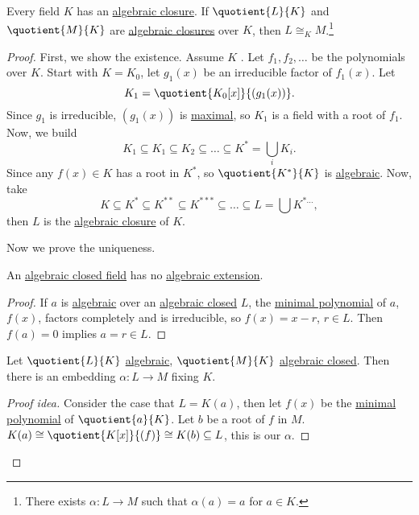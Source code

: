 \begin{theorem}
	Every field \(K\) has an \hyperref[def:algebraically-closed]{algebraic closure}. If \(\quotient{L}{K} \) and \(\quotient{M}{K} \) are \hyperref[def:algebraically-closed]{algebraic closures} over \(K\), then \(L \cong _{K} M\).\footnote{There exists \(\alpha \colon L \to M\) such that \(\alpha (a) = a\) for \(a\in K\).}
\end{theorem}
\begin{proof}
	First, we show the existence. Assume \(K\) . Let \(f_1, f_2, \ldots \) be the polynomials over \(K\). Start with \(K = K_0\), let \(g_1(x)\) be an irreducible factor of \(f_1(x)\). Let
	\[
		K_1 = \quotient{K_0[x]}{(g_1(x))}.
	\]
	Since \(g_1\) is irreducible, \((g_1(x))\) is \hyperref[def:proper-ideal-maximal]{maximal}, so \(K_1\) is a field with a root of \(f_1\). Now, we build
	\[
		K_1 \subseteq K_1 \subseteq K_2 \subseteq \ldots \subseteq K^{\ast} = \bigcup_{i} K_i.
	\]
	Since any \(f(x)\in K\) has a root in \(K^{\ast} \), so \(\quotient{K^{\ast} }{K} \) is \hyperref[def:algebraic-extension]{algebraic}.
	Now, take
	\[
		K\subseteq K^{\ast} \subseteq K^{\ast\ast } \subseteq K^{\ast\ast \ast } \subseteq \ldots \subseteq L = \bigcup K^{\ast \ldots },
	\]
	then \(L\) is the \hyperref[def:algebraically-closed]{algebraic closure} of \(K\).

	Now we prove the uniqueness.

	\begin{lemma}\label{lma:lec11-1}
		An \hyperref[def:algebraically-closed]{algebraic closed field} has no \hyperref[def:algebraic-extension]{algebraic extension}.
	\end{lemma}
	\begin{proof}
		If \(a\) is \hyperref[def:algebraic]{algebraic} over an \hyperref[def:algebraically-closed]{algebraic closed} \(L\), the \hyperref[def:minimal-polynomial]{minimal polynomial} of \(a\), \(f(x)\), factors completely and is irreducible, so \(f(x) = x-r\), \(r\in L\). Then \(f(a) = 0\) implies \(a = r\in L\).
	\end{proof}

	\begin{lemma}\label{lma:lec11-2}
		Let \(\quotient{L}{K} \) \hyperref[def:algebraic-extension]{algebraic}, \(\quotient{M}{K} \) \hyperref[def:algebraically-closed]{algebraic closed}. Then there is an embedding \(\alpha \colon L \to M\) fixing \(K\).
	\end{lemma}
	\begin{proof}[Proof idea]
		Consider the case that \(L = K(a)\), then let \(f(x)\) be the \hyperref[def:minimal-polynomial]{minimal polynomial} of \(\quotient{a}{K} \). Let \(b\) be a root of \(f\) in \(M\). \(K(a) \cong \quotient{K[x]}{(f)} \cong K(b) \subseteq L\), this is our \(\alpha \).


\end{proof}
\end{proof}
